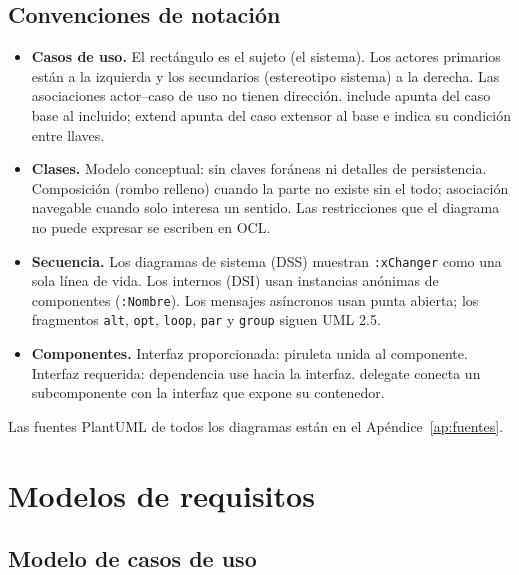 \documentclass[11pt,a4paper]{report}
\begin{document}
\section{Convenciones de notación}
\begin{itemize}[leftmargin=*,itemsep=1pt]
\item \textbf{Casos de uso.} El rectángulo es el sujeto (el sistema). Los actores primarios están a la izquierda y los secundarios (estereotipo \guillemotleft sistema\guillemotright) a la derecha. Las asociaciones actor–caso de uso no tienen dirección. \guillemotleft include\guillemotright{} apunta del caso base al incluido; \guillemotleft extend\guillemotright{} apunta del caso extensor al base e indica su condición entre llaves.
\item \textbf{Clases.} Modelo conceptual: sin claves foráneas ni detalles de persistencia. Composición (rombo relleno) cuando la parte no existe sin el todo; asociación navegable cuando solo interesa un sentido. Las restricciones que el diagrama no puede expresar se escriben en OCL.
\item \textbf{Secuencia.} Los diagramas de sistema (DSS) muestran \texttt{:xChanger} como una sola línea de vida. Los internos (DSI) usan instancias anónimas de componentes (\texttt{:Nombre}). Los mensajes asíncronos usan punta abierta; los fragmentos \texttt{alt}, \texttt{opt}, \texttt{loop}, \texttt{par} y \texttt{group} siguen UML 2.5.
\item \textbf{Componentes.} Interfaz proporcionada: piruleta unida al componente. Interfaz requerida: dependencia \guillemotleft use\guillemotright{} hacia la interfaz. \guillemotleft delegate\guillemotright{} conecta un subcomponente con la interfaz que expone su contenedor.
\end{itemize}
Las fuentes PlantUML de todos los diagramas están en el Apéndice~\ref{ap:fuentes}.

\chapter{Modelos de requisitos}

\section{Modelo de casos de uso}
\end{document}
